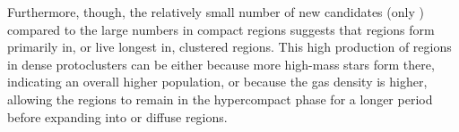 \documentclass[twocolumn]{aastex62}
\begin{document}
Furthermore, though, the relatively small number of new candidates (only
\mmdetectionscmnondetectionscompact) compared to the large numbers in compact
regions suggests that \hchii regions
form primarily in, or live longest in, clustered regions.  This high production
of \hchii regions in dense protoclusters can be either because more high-mass stars
form there, indicating an overall higher population, or because the gas density is
higher, allowing the \hii regions to remain in the hypercompact phase for a longer
period before expanding into \uchii or diffuse \hii regions.


% 
% 
% 




\end{document}

